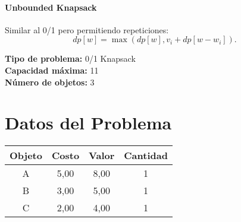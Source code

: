 \documentclass{article}
\begin{document}
\paragraph{Unbounded Knapsack} Similar al 0/1 pero permitiendo repeticiones:
\[
dp[w] = \max ( dp[w], v_i + dp[w - w_i] ).
\]

\thispagestyle{empty}
\newpage
\textbf{Tipo de problema:} 0/1 Knapsack\\
\textbf{Capacidad máxima:} 11\\
\textbf{Número de objetos:} 3\\

\clearpage
\section*{Datos del Problema}
\begin{tabular}{|c|c|c|c|}
\hline
Objeto & Costo & Valor & Cantidad \\
\hline
A & 5,00 & 8,00 & 1 \\
B & 3,00 & 5,00 & 1 \\
C & 2,00 & 4,00 & 1 \\
\hline
\end{tabular}
\end{document}
